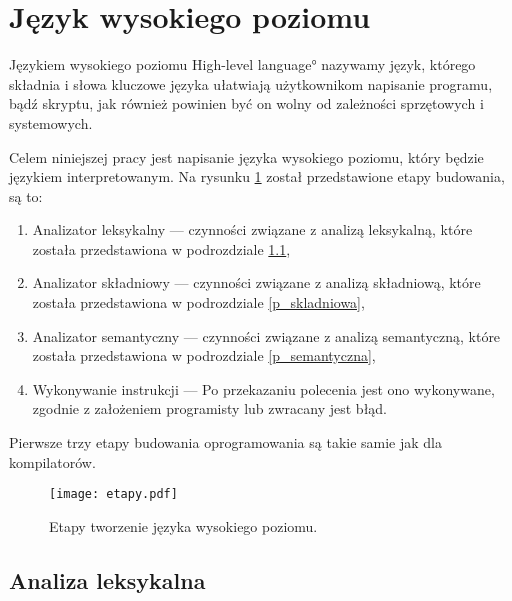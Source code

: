 \section{Język wysokiego poziomu }

Językiem wysokiego poziomu \ang{High-level language} nazywamy język, 
którego składnia i słowa kluczowe języka ułatwiają użytkownikom  napisanie programu, bądź skryptu,
jak również powinien być on wolny od zależności sprzętowych i systemowych.

Celem niniejszej pracy jest napisanie języka wysokiego poziomu, który będzie językiem interpretowanym.
Na rysunku \ref{fig:etapy} został przedstawione etapy budowania, są to:
\begin{enumerate}
 \item Analizator leksykalny  --- czynności związane z analizą leksykalną, które  została przedstawiona w podrozdziale  \ref{p_leksykalna},
 \item Analizator składniowy  --- czynności związane z analizą składniową, które  została przedstawiona w podrozdziale  \ref{p_skladniowa},
 \item Analizator semantyczny --- czynności związane z analizą semantyczną, które  została przedstawiona w podrozdziale \ref{p_semantyczna},
 \item Wykonywanie instrukcji --- Po przekazaniu polecenia jest ono wykonywane, zgodnie z założeniem programisty lub zwracany jest błąd.
\end{enumerate}
Pierwsze trzy etapy budowania oprogramowania są takie samie jak dla kompilatorów.\cite{aho}

 \begin{center}
\begin{figure}[H]
  \begin{center}
    \texttt{[image: etapy.pdf]}
  \end{center}
  \caption{Etapy tworzenie języka wysokiego poziomu. }
    \label{fig:etapy}
\end{figure}
\end{center}


\subsection{Analiza leksykalna} \label{p_leksykalna}

